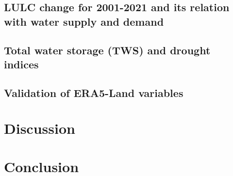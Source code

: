 \documentclass[
  number,
  preprint,
  3p]{elsarticle}
\begin{document}
\hypertarget{lulc-change-for-2001-2021-and-its-relation-with-water-supply-and-demand-1}{%
\subsection{LULC change for 2001-2021 and its relation with water supply
and
demand}\label{lulc-change-for-2001-2021-and-its-relation-with-water-supply-and-demand-1}}

\hypertarget{total-water-storage-tws-and-drought-indices}{%
\subsection{Total water storage (TWS) and drought
indices}\label{total-water-storage-tws-and-drought-indices}}

\hypertarget{validation-of-era5-land-variables-1}{%
\subsection{Validation of ERA5-Land
variables}\label{validation-of-era5-land-variables-1}}

\hypertarget{discussion}{%
\section{Discussion}\label{discussion}}

\hypertarget{conclusion}{%
\section{Conclusion}\label{conclusion}}


\renewcommand\refname{References}
  
\end{document}
